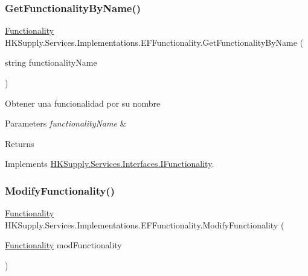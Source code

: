 \subsubsection{\texorpdfstring{Get\+Functionality\+By\+Name()}{GetFunctionalityByName()}}
{\footnotesize\ttfamily \hyperlink{class_h_k_supply_1_1_models_1_1_functionality}{Functionality} H\+K\+Supply.\+Services.\+Implementations.\+E\+F\+Functionality.\+Get\+Functionality\+By\+Name (\begin{DoxyParamCaption}\item[{string}]{functionality\+Name }\end{DoxyParamCaption})}



Obtener una funcionalidad por su nombre 


\begin{DoxyParams}{Parameters}
{\em functionality\+Name} & \\
\hline
\end{DoxyParams}
\begin{DoxyReturn}{Returns}

\end{DoxyReturn}


Implements \hyperlink{interface_h_k_supply_1_1_services_1_1_interfaces_1_1_i_functionality}{H\+K\+Supply.\+Services.\+Interfaces.\+I\+Functionality}.

\mbox{\label{class_h_k_supply_1_1_services_1_1_implementations_1_1_e_f_functionality_ae4f83037cd6ef526f55de1a2ba442cc6}} 
\subsubsection{\texorpdfstring{Modify\+Functionality()}{ModifyFunctionality()}}
{\footnotesize\ttfamily \hyperlink{class_h_k_supply_1_1_models_1_1_functionality}{Functionality} H\+K\+Supply.\+Services.\+Implementations.\+E\+F\+Functionality.\+Modify\+Functionality (\begin{DoxyParamCaption}\item[{\hyperlink{class_h_k_supply_1_1_models_1_1_functionality}{Functionality}}]{mod\+Functionality }\end{DoxyParamCaption})}



